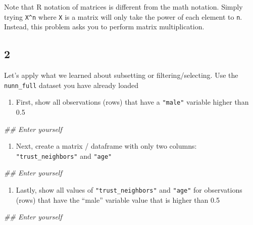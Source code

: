 \documentclass[]{book}
\newenvironment{Shaded}{\begin{snugshade}}{\end{snugshade}}
\newcommand{\CommentTok}[1]{\textcolor[rgb]{0.56,0.35,0.01}{\textit{#1}}}
\providecommand{\tightlist}{%
  \setlength{\itemsep}{0pt}\setlength{\parskip}{0pt}}
\theoremstyle{definition}
\theoremstyle{definition}
\theoremstyle{definition}
\theoremstyle{remark}
\begin{document}
\begin{Shaded}
\begin{Highlighting}[]
\begin{Shaded}
\begin{Highlighting}[]
Note that R notation of matrices is different from the math notation. Simply trying \texttt{X\^{}n} where \texttt{X} is a matrix will only take the power of each element to \texttt{n}. Instead, this problem asks you to perform matrix multiplication.

\hypertarget{section-10}{%
\subsection*{2}\label{section-10}}

Let's apply what we learned about subsetting or filtering/selecting. Use the \texttt{nunn\_full} dataset you have already loaded

\begin{enumerate}
\def\labelenumi{\alph{enumi})}
\tightlist
\item
  First, show all observations (rows) that have a \texttt{"male"} variable higher than 0.5
\end{enumerate}

\begin{Shaded}
\begin{Highlighting}[]
\CommentTok{## Enter yourself}
\end{Highlighting}
\end{Shaded}

\begin{enumerate}
\def\labelenumi{\alph{enumi})}
\setcounter{enumi}{1}
\tightlist
\item
  Next, create a matrix / dataframe with only two columns: \texttt{"trust\_neighbors"} and \texttt{"age"}
\end{enumerate}

\begin{Shaded}
\begin{Highlighting}[]
\CommentTok{## Enter yourself}
\end{Highlighting}
\end{Shaded}

\begin{enumerate}
\def\labelenumi{\alph{enumi})}
\setcounter{enumi}{2}
\tightlist
\item
  Lastly, show all values of \texttt{"trust\_neighbors"} and \texttt{"age"} for observations (rows) that have the ``male'' variable value that is higher than 0.5
\end{enumerate}

\begin{Shaded}
\begin{Highlighting}[]
\CommentTok{## Enter yourself}
\end{Highlighting}
\end{Shaded}


\end{Highlighting}
\end{Shaded}
\end{Highlighting}
\end{Shaded}
\end{document}
